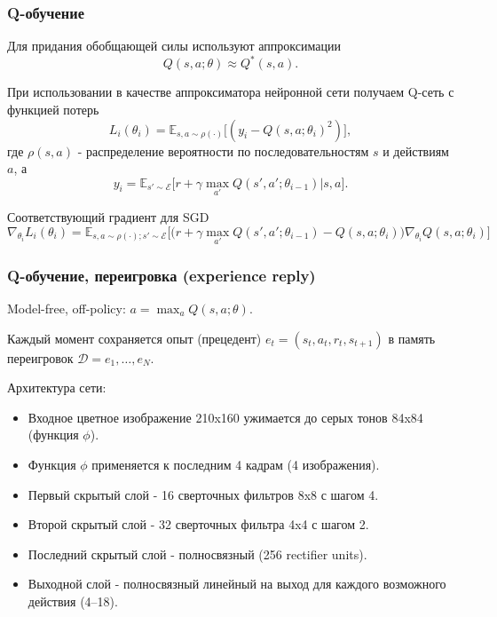 \documentclass[default]{beamer}
\begin{document}
	
	\begin{frame}	
		\frametitle{Q-обучение}
		\small
		Для придания обобщающей силы используют аппроксимации
		\[
			Q(s,a;\theta)\approx Q^*(s,a).
		\]
		\par\medskip
		При использовании в качестве аппроксиматора нейронной сети получаем Q-сеть с функцией потерь
		\[
			L_i(\theta_i)=\mathbb E_{s,a\sim\rho(\cdot)}\big[(y_i-Q(s,a;\theta_i)^2)\big],
		\]
		где $\rho(s,a)$ - распределение вероятности по последовательностям $s$ и действиям $a$, а
		\[
			y_i=\mathbb E_{s'\sim\mathcal E}\big[r+\gamma\max_{a'}Q(s',a';\theta_{i-1})\big|s,a\big].
		\]
		\par\medskip
		Соответствующий градиент для SGD
		\[
			\nabla_{\theta_i}L_i(\theta_i)=\mathbb E_{s,a\sim\rho(\cdot);s'\sim\mathcal E}\bigg[\big(r+\gamma\max_{a'}Q(s',a';\theta_{i-1})-Q(s,a;\theta_i)\big)\nabla_{\theta_i}Q(s,a;\theta_i)\bigg]
		\]
		
	\end{frame}	
	
	\begin{frame}
		\frametitle{Q-обучение, переигровка (experience reply)}
		
		Model-free, off-policy: $a=\max_a Q(s,a;\theta)$.
		\par\medskip
		Каждый момент сохраняется опыт (прецедент) $e_t=(s_t,a_t,r_t,s_{t+1})$ в память переигровок $\mathcal D=e_1,\dots,e_N$.
		
		\par\medskip
		Архитектура сети:
		\begin{itemize}
			\item Входное цветное изображение 210x160 ужимается до серых тонов 84x84 (функция $\phi$).
			\item Функция $\phi$ применяется к последним 4 кадрам (4 изображения).
			 \item Первый скрытый слой - 16 сверточных фильтров 8x8 с шагом 4.
			 \item Второй скрытый слой - 32 сверточных фильтра 4x4 с шагом 2.
			 \item Последний скрытый слой - полносвязный (256 rectifier units).
			 \item Выходной слой - полносвязный линейный на выход для каждого возможного действия (4--18).
		\end{itemize}
										
	\end{frame}											
										
\end{document}
